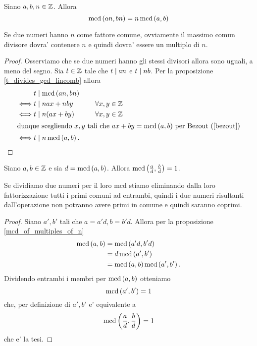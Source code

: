 \begin{proposition} \label{mcd_of_multiples_of_n}
    Siano $a, b, n \in \mathbb{Z}$. Allora \begin{equation}
        \operatorname{mcd}\left(an, bn\right) = n\operatorname{mcd}\left(a, b\right)
    \end{equation}
\end{proposition}
\begin{intuition}
    Se due numeri hanno $n$ come fattore comune, ovviamente il massimo comun divisore dovra' contenere $n$ e quindi dovra' essere un multiplo di $n$.
\end{intuition}
\begin{proof}
    Osserviamo che se due numeri hanno gli stessi divisori allora sono uguali, a meno del segno.
    Sia $t \in \mathbb{Z}$ tale che $t \mid an$ e $t \mid nb$. Per la proposizione \ref{t_divides_gcd_lincomb} allora 
    \begin{alignat*}
        {2}
        &t \mid \operatorname{mcd}\left(an, bn\right)\\
        \iff &t \mid nax + nby      \qquad& \forall x, y \in \mathbb{Z} \\
        \iff &t \mid n(ax + by)     \qquad& \forall x, y \in \mathbb{Z} \\
        \intertext{dunque scegliendo $x, y$ tali che $ax+by = \operatorname{mcd}\left(a, b\right)$ per Bezout (\ref{bezout})}
        \iff &t \mid n\operatorname{mcd}\left(a, b\right).
    \end{alignat*}
\end{proof}


\begin{corollary} \label{mcd_diviso_mcd}
    Siano $a, b \in \mathbb{Z}$ e sia $d = \operatorname{mcd}\left(a, b\right)$. Allora $\operatorname{mcd}\left(\frac{a}{d}, \frac{b}{d}\right) = 1$.
\end{corollary}
\begin{intuition}
    Se dividiamo due numeri per il loro mcd stiamo eliminando dalla loro fattorizzazione tutti i primi comuni ad entrambi, quindi i due numeri risultanti dall'operazione non potranno avere primi in comune e quindi saranno coprimi.
\end{intuition}
\begin{proof}
    Siano $a', b'$ tali che $a = a'd, b = b'd$. Allora per la proposizione \ref{mcd_of_multiples_of_n}
    \begin{alignat*}{1}
        \operatorname{mcd}\left(a, b\right) &= \operatorname{mcd}\left(a'd, b'd\right) \\
                   &= d\operatorname{mcd}\left(a', b'\right) \\
                   &= \operatorname{mcd}\left(a, b\right) \operatorname{mcd}\left(a', b'\right).
        \end{alignat*} 
    Dividendo entrambi i membri per $\operatorname{mcd}\left(a, b\right)$ otteniamo \[
        \operatorname{mcd}\left(a', b'\right) = 1 
    \]
    che, per definizione di $a', b'$ e' equivalente a \[
        \operatorname{mcd}\left(\frac{a}{d}, \frac{b}{d}\right) = 1
    \]
    che e' la tesi.
\end{proof}




